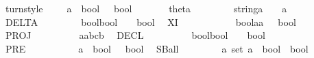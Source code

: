 \begin{isabellebody}
\ \ turnstyle\ \ \ \ {\isacharcolon}{\isacharcolon}\ {\isachardoublequoteopen}{\isacharparenleft}{\isacharprime}a\ {\isacharequal}{\isachargreater}\ bool{\isacharparenright}\ \ {\isacharequal}{\isachargreater}\ bool\ {\isachardoublequoteclose}\ {\isacharparenleft}{\isachardoublequoteopen}{\isacharbar}{\isacharminus}\ {\isacharparenleft}{}{\isacharunderscore}{\isacharparenright}{\isachardoublequoteclose}\ {\isacharparenright}\ \isanewline
\ \ theta\ \ \ \ \ \ \ \ {\isacharcolon}{\isacharcolon}\ {\isachardoublequoteopen}{\isacharbrackleft}string{\isacharcomma}{\isacharprime}a{\isacharbrackright}\ \ \ {\isacharequal}{\isachargreater}\ {\isacharprime}a{\isachardoublequoteclose}\isanewline
\ \ DELTA\ \ \ \ \ \ \ \ {\isacharcolon}{\isacharcolon}\ {\isachardoublequoteopen}{\isacharbrackleft}bool{\isacharcomma}bool{\isacharbrackright}\ \ \ {\isacharequal}{\isachargreater}\ bool{\isachardoublequoteclose}\isanewline
\ \ XI\ \ \ \ \ \ \ \ \ \ \ {\isacharcolon}{\isacharcolon}\ {\isachardoublequoteopen}{\isacharbrackleft}bool{\isacharcomma}{\isacharprime}a{\isacharcomma}{\isacharprime}a{\isacharbrackright}\ \ {\isacharequal}{\isachargreater}\ bool{\isachardoublequoteclose}\isanewline
\ \ PROJ\ \ \ \ \ \ \ \ \ {\isacharcolon}{\isacharcolon}\ {\isachardoublequoteopen}{\isacharbrackleft}{\isacharprime}a{\isacharcomma}{\isacharprime}a{\isacharequal}{\isachargreater}{\isacharprime}b{\isacharcomma}{\isacharprime}c{\isacharbrackright}{\isacharequal}{\isachargreater}{\isacharprime}b{\isachardoublequoteclose}\isanewline
\ \ DECL\ \ \ \ \ \ \ \ \ {\isacharcolon}{\isacharcolon}\ {\isachardoublequoteopen}{\isacharbrackleft}bool{\isacharcomma}bool{\isacharbrackright}\ \ \ {\isacharequal}{\isachargreater}\ bool{\isachardoublequoteclose}\ \ {\isacharparenleft}{\isachardoublequoteopen}{\isacharparenleft}{}{\isacharunderscore}{\isacharslash}\ {\isacharbar}{\isacharminus}{\isacharminus}{\isacharminus}{\isacharminus}{\isacharslash}\ {\isacharunderscore}{\isacharparenright}{\isachardoublequoteclose}\ {\isacharbrackleft}{}{}{\isacharcomma}{}{}{\isacharbrackright}{}{}{\isacharparenright}\isanewline
\ \ PRE\ \ \ \ \ \ \ \ \ \ {\isacharcolon}{\isacharcolon}\ {\isachardoublequoteopen}{\isacharbrackleft}{\isacharprime}a\ {\isacharequal}{\isachargreater}\ bool{\isacharbrackright}\ \ {\isacharequal}{\isachargreater}\ bool{\isachardoublequoteclose}\isanewline
\ \ SBall\ \ \ \ \ \ \ \ {\isacharcolon}{\isacharcolon}\ {\isachardoublequoteopen}{\isacharbrackleft}{\isacharprime}a\ set{\isacharcomma}\ {\isacharprime}a\ {\isacharequal}{\isachargreater}\ bool{\isacharbrackright}\ {\isacharequal}{\isachargreater}\ bool{\isachardoublequoteclose}\isanewline

\end{isabellebody}
